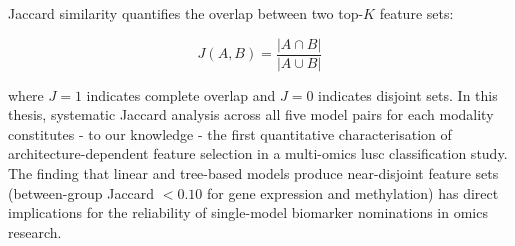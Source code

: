 Jaccard similarity quantifies the overlap between two top-$K$ feature sets:
 
\begin{equation}
J(A, B) = \frac{|A \cap B|}{|A \cup B|}
\label{eq:jaccard}
\end{equation}
 
where $J = 1$ indicates complete overlap and $J = 0$ indicates disjoint sets. In this thesis, systematic Jaccard analysis across all five model pairs for each modality constitutes - to our knowledge - the first quantitative characterisation of architecture-dependent feature selection in a multi-omics \gls{lusc} classification study. The finding that linear and tree-based models produce near-disjoint feature sets (between-group Jaccard $< 0.10$ for gene expression and methylation) has direct implications for the reliability of single-model biomarker nominations in omics research.
 
